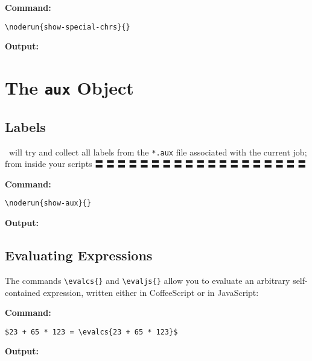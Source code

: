{\textbf{Command:}}

\begin{verbatim}
\noderun{show-special-chrs}{}
\end{verbatim}

{\textbf{Output:}}



\clearpage\section{The \texttt{aux} Object}\label{aux}



\subsection{Labels}\label{labels}

\CXLTX\ will try and collect all labels from the \verb#*.aux# file associated with the current job; from
inside your scripts 〓 〓 〓 〓 〓 〓 〓 〓 〓 〓 〓 〓 〓 〓 〓 〓 〓 〓 〓

{\textbf{Command:}}

\begin{verbatim}
\noderun{show-aux}{}
\end{verbatim}

{\textbf{Output:}}

{\fontsize{3mm}{3mm}}


\subsection{Evaluating Expressions}\label{evalcs}

The commands \verb#\evalcs{}# and \verb#\evaljs{}# allow you to evaluate an arbitrary self-contained
expression, written either in CoffeeScript or in JavaScript:

{\textbf{Command:}}

\begin{verbatim}
$23 + 65 * 123 = \evalcs{23 + 65 * 123}$
\end{verbatim}

{\textbf{Output:}}

